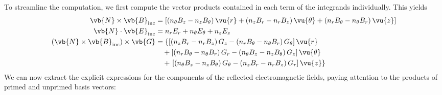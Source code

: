 \documentclass[11pt,SymmetricalJury]{inrsthesis/inrsthesis}
\begin{document}
To streamline the computation, we first compute the vector products contained
in each term of the integrands individually. This yields
  \begin{align}
    \vb{N}\times\vb{B}_\text{inc}
                &= \left[
                \left(n_\theta B_z-n_z B_\theta\right) \vu{r}
                    +\left(n_z B_r-n_r B_z\right)      \vu{\theta}
                    +\left(n_r B_\theta- n_\theta B_r\right)  \vu{z}
                  \right] \\
    \vb{N}\cdot\vb{E}_\text{inc}
                &= n_r E_r + n_\theta E_\theta + n_z E_z \\
    (\vb{N}\times\vb{B}_\text{inc})\times\vb{G}
                &= \left\{
                      \left[
                        \left( n_z B_r - n_r B_z \right) G_z
                        -\left( n_r B_\theta - n_\theta B_r \right) G_\theta
                      \right] \vu{r} \right. \nonumber\\
                &\quad+\left[
                        \left( n_r B_\theta - n_\theta B_r \right) G_r
                       -\left( n_\theta B_z - n_z B_\theta\right) G_z
                      \right]  \vu{\theta} \nonumber\\
                &\quad+\left.\left[
                    \left( n_\theta B_z-n_z B_\theta \right) G_\theta
                    -\left( n_z B_r - n_r B_z \right) G_r
                      \right]\vu{z}\right\}
  \end{align}
We can now extract the explicit expressions for the components of the reflected
electromagnetic fields, paying attention to the products of primed and unprimed
basis vectors:
\end{document}
